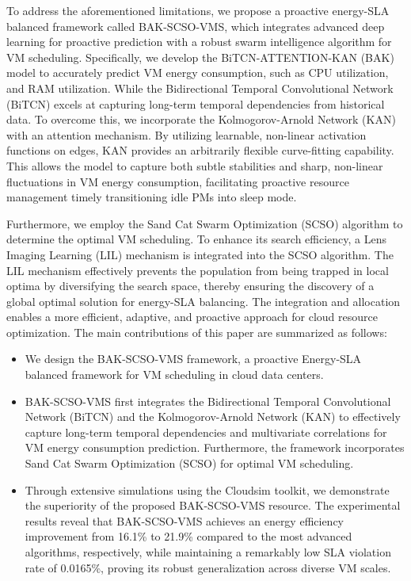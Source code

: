 \documentclass[conference]{{IEEEtran}}
\begin{document}
To address the aforementioned limitations, we propose a proactive energy-SLA balanced framework called BAK-SCSO-VMS, which integrates advanced deep learning for proactive prediction with a robust swarm intelligence algorithm for VM scheduling. Specifically, we develop the BiTCN-ATTENTION-KAN (BAK) model to accurately predict  VM energy consumption, such as CPU utilization, and RAM utilization. While the Bidirectional Temporal Convolutional Network (BiTCN) excels at capturing long-term temporal dependencies from historical data. To overcome this, we incorporate the Kolmogorov-Arnold Network (KAN) with an attention mechanism. By utilizing learnable, non-linear activation functions on edges, KAN provides an arbitrarily flexible curve-fitting capability. This allows the model to capture both subtle stabilities and sharp, non-linear fluctuations in VM energy consumption, facilitating proactive resource management timely transitioning idle PMs into sleep mode.

Furthermore, we employ the Sand Cat Swarm Optimization (SCSO) algorithm to determine the optimal VM scheduling. To enhance its search efficiency, a Lens Imaging Learning (LIL) mechanism is integrated into the SCSO algorithm. The LIL mechanism effectively prevents the population from being trapped in local optima by diversifying the search space, thereby ensuring the discovery of a global optimal solution for energy-SLA balancing. The integration and allocation enables a more efficient, adaptive, and proactive approach for cloud resource optimization. The main contributions of this paper are summarized as follows:

\begin{itemize}
    \item  We design the BAK-SCSO-VMS framework, a proactive Energy-SLA balanced framework for VM scheduling in cloud data centers.

    \item  BAK-SCSO-VMS first integrates the Bidirectional Temporal Convolutional Network (BiTCN) and the Kolmogorov-Arnold Network (KAN) to effectively capture long-term temporal dependencies and multivariate correlations for VM energy consumption prediction. Furthermore, the framework incorporates Sand Cat Swarm Optimization (SCSO) for optimal VM scheduling.

    \item  Through extensive simulations using the Cloudsim toolkit, we demonstrate the superiority of the proposed BAK-SCSO-VMS resource. The experimental results reveal that BAK-SCSO-VMS achieves an energy efficiency improvement from 16.1\% to 21.9\% compared to the most advanced algorithms, respectively, while maintaining a remarkably low SLA violation rate of 0.0165\%, proving its robust generalization across diverse VM scales.
\end{itemize}
\end{document}
